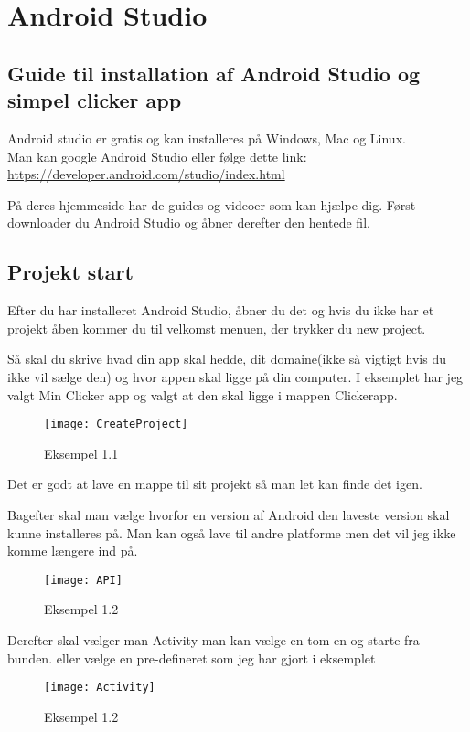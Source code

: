 \chapter{Android Studio}

\section{Guide til installation af Android Studio og simpel clicker app}
Android studio er gratis og kan installeres på Windows, Mac og Linux.\\
Man kan google Android Studio eller følge dette link:\\
\url{https://developer.android.com/studio/index.html}

På deres hjemmeside har de guides og videoer som kan hjælpe dig.
Først downloader du Android Studio og åbner derefter den hentede fil.

\section{Projekt start}
Efter du har installeret Android Studio, åbner du det og hvis du ikke har et projekt åben kommer du til velkomst menuen, der trykker du new project.

Så skal du skrive hvad din app skal hedde, dit domaine(ikke så vigtigt hvis du ikke vil sælge den) og hvor appen skal ligge på din computer. I eksemplet har jeg valgt Min Clicker app og valgt at den skal ligge i mappen Clickerapp. 
\begin{figure}[H]
	\texttt{[image: CreateProject]}
	\caption{Eksempel 1.1}
	\label{fig:createproject}
\end{figure}
Det er godt at lave en mappe til sit projekt så man let kan finde det igen. 

Bagefter skal man vælge hvorfor en version af Android den laveste version skal kunne installeres på. Man kan også lave til andre platforme men det vil jeg ikke komme længere ind på. 
\begin{figure}[H]
	\texttt{[image: API]}
	\caption{Eksempel 1.2}
	\label{fig:API}
\end{figure}

Derefter skal vælger man Activity
man kan vælge en tom en og starte fra bunden. eller vælge en pre-defineret som jeg har gjort i eksemplet

\begin{figure}[H]
	\texttt{[image: Activity]}
	\caption{Eksempel 1.2}
	\label{fig:Activiy}
\end{figure}

